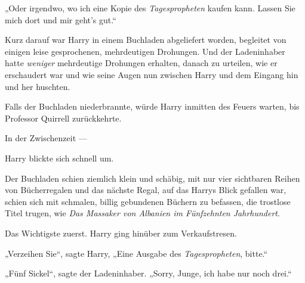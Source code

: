 „Oder irgendwo, wo ich eine Kopie des \emph{Tagespropheten} kaufen kann. Lassen Sie mich dort und mir geht’s gut.“

Kurz darauf war Harry in einem Buchladen abgeliefert worden, begleitet von einigen leise gesprochenen, mehrdeutigen Drohungen. Und der Ladeninhaber hatte \emph{weniger} mehrdeutige Drohungen erhalten, danach zu urteilen, wie er erschaudert war und wie seine Augen nun zwischen Harry und dem Eingang hin und her huschten.

Falls der Buchladen niederbrannte, würde Harry inmitten des Feuers warten, bis Professor Quirrell zurückkehrte.

In der Zwischenzeit —

Harry blickte sich schnell um.

Der Buchladen schien ziemlich klein und schäbig, mit nur vier sichtbaren Reihen von Bücherregalen und das nächste Regal, auf das Harrys Blick gefallen war, schien sich mit schmalen, billig gebundenen Büchern zu befassen, die trostlose Titel trugen, wie \emph{Das Massaker von Albanien im Fünfzehnten Jahrhundert}.%

Das Wichtigste zuerst. Harry ging hinüber zum Verkaufstresen.

„Verzeihen Sie“, sagte Harry,
„Eine Ausgabe des \emph{Tagespropheten}, bitte.“

„Fünf Sickel“, sagte der Ladeninhaber.
„Sorry, Junge, ich habe nur noch drei.“

